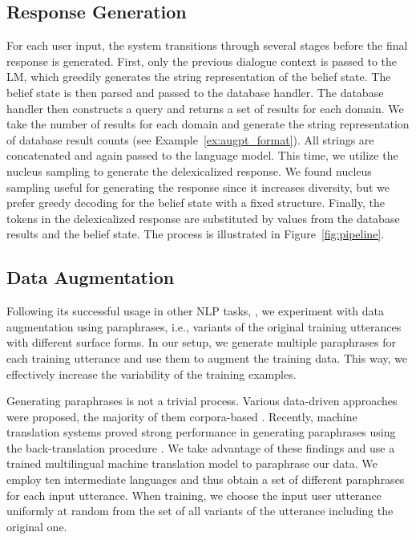 \documentclass[letterpaper]{article} %
\newcommand{\exampleref}[1]{Example~\ref{#1}}
\newcommand{\exampleref}[1]{Figure~\ref{#1}}
\begin{document}
\subsection{Response Generation}
For each user input, the system transitions through several stages before the final response is generated. First, only the previous dialogue context is passed to the LM, which greedily generates the string representation of the belief state. The belief state is then parsed and passed to the database handler. The database handler then constructs a query and returns a set of results for each domain. We take the number of results for each domain and generate the string representation of database result counts (see \exampleref{ex:augpt_format}). All strings are concatenated and again passed to the language model. This time, we utilize the nucleus sampling \cite{holtzman2019} to generate the delexicalized response. We found nucleus sampling useful for generating the response since it increases diversity, but we prefer greedy decoding for the belief state with a fixed structure. Finally, the tokens in the delexicalized response are substituted by values from the database results and the belief state. The process is illustrated in Figure~\ref{fig:pipeline}.

\subsection{Data Augmentation}
Following its successful usage in other NLP tasks, \cite{konstas_neural_2017,elder_shape_2020}, we experiment with data augmentation using paraphrases, i.e., variants of the original training utterances with different surface forms.
In our setup, we generate multiple paraphrases for each training utterance and use them to augment the training data.
This way, we effectively increase the variability of the training examples.

Generating paraphrases is not a trivial process.
Various data-driven approaches were proposed, the majority of them corpora-based \cite{madnani2010generating}.
Recently, machine translation systems proved strong performance in generating paraphrases using the back-translation procedure \cite{sennrich2016,edunov2018,federmann2019multilingual}.
We take advantage of these findings and use a trained multilingual machine translation model \cite{machavcek2020elitr,edunov2018} to paraphrase our data.
We employ ten intermediate languages and thus obtain a set of different paraphrases for each input utterance.
When training, we choose the input user utterance uniformly at random from the set of all variants of the utterance including the original one.
\end{document}
